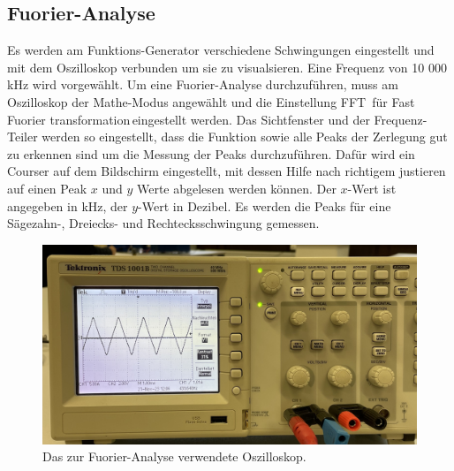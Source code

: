 \subsection{Fuorier-Analyse}
Es werden am Funktions-Generator verschiedene Schwingungen eingestellt und mit dem Oszilloskop verbunden um sie zu 
visualsieren. Eine Frequenz von 10 000\,kHz wird vorgewählt. Um eine Fuorier-Analyse durchzuführen, muss am Oszilloskop
der Mathe-Modus angewählt und die Einstellung \glqq FFT\grqq\, für \glqq Fast Fuorier transformation\grqq \,eingestellt werden. Das Sichtfenster 
und der Frequenz-Teiler werden so eingestellt, dass die Funktion sowie alle Peaks der Zerlegung gut zu erkennen sind um die Messung der Peaks
durchzuführen. Dafür wird ein Courser auf dem Bildschirm eingestellt, mit dessen Hilfe nach richtigem justieren auf einen Peak
$x$ und $y$ Werte abgelesen werden können. Der $x$-Wert ist angegeben in kHz, der $y$-Wert in Dezibel. Es werden die Peaks für eine Sägezahn-,
Dreiecks- und Rechtecksschwingung gemessen.
\begin{figure}[H]
    \centering
    \includegraphics[scale=0.1]{Messdaten_Bilder/Oszilloskop.jpeg}
    \caption{Das zur Fuorier-Analyse verwendete Oszilloskop.}
    \label{fig:Oszilloskop}
\end{figure}